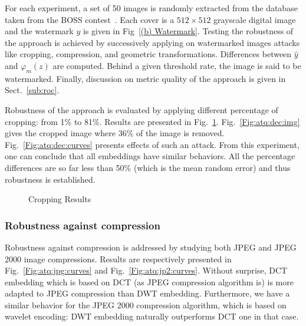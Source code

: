 \documentclass{comjnl}
\begin{document}
For each experiment, a set of 50 images is randomly extracted 
from the database taken from the BOSS contest~\cite{Boss10}. 
Each cover is a $512\times 512$ grayscale digital image and the watermark $y$ 
is given in Fig~\ref{(b) Watermark}. 
Testing the robustness of the approach is achieved by successively applying
on watermarked images attacks like cropping, compression, and geometric 
transformations.
Differences between 
$\hat{y}$ and $\varphi_m(z)$ are 
computed. Behind a given threshold rate, the image is said to be watermarked.  
Finally, discussion on metric quality of the approach is given in 
Sect.~\ref{sub:roc}.

 


Robustness of the approach is  evaluated by
applying different percentage of cropping: from 1\% to 81\%.
Results are presented in Fig.~\ref{Fig:atck:dec}. Fig.~\ref{Fig:atq:dec:img}
gives the cropped image 
where 36\% of the image is removed.
Fig.~\ref{Fig:atq:dec:curves} presents effects of such an attack.
From this experiment, one can conclude that all embeddings have similar 
behaviors.
All the percentage differences are so far less than 50\% 
(which is the mean random error) and thus robustness is established.



\begin{figure}[ht]
  \centering
{}\hspace{2cm}
\caption{Cropping Results}
\label{Fig:atck:dec}
\end{figure}


\subsubsection{Robustness against compression}

Robustness against compression is addressed
by studying both JPEG  and JPEG 2000 image compressions.
Results are respectively presented in Fig.~\ref{Fig:atq:jpg:curves}
and Fig.~\ref{Fig:atq:jp2:curves}.
Without surprise, DCT embedding which is based on DCT 
(as JPEG compression algorithm is) is  more 
adapted to JPEG compression than DWT embedding.
Furthermore, we have a similar behavior for the JPEG 2000 compression algorithm, which is based on wavelet encoding: DWT embedding naturally outperforms
DCT one in that case.  
\end{document}
